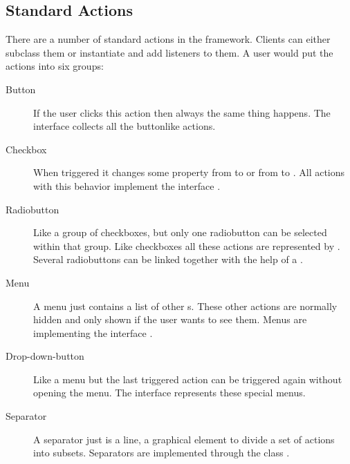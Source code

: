 

\subsection{Standard Actions}
There are a number of standard actions in the framework. Clients can either subclass them or instantiate and add listeners to them. A user would put the actions into six groups:
\begin{description}
 \item[Button] If the user clicks this action then always the same thing happens. The interface  collects all the buttonlike actions.
 \item[Checkbox] When triggered it changes some property from  to  or from  to . All actions with this behavior implement the interface .
 \item[Radiobutton] Like a group of checkboxes, but only one radiobutton can be selected within that group. Like checkboxes all these actions are represented by . Several radiobuttons can be linked together with the help of a .
 \item[Menu] A menu just contains a list of other s. These other actions are normally hidden and only shown if the user wants to see them. Menus are implementing the interface .
 \item[Drop-down-button] Like a menu but the last triggered action can be triggered again without opening the menu. The interface  represents these special menus.
 \item[Separator] A separator just is a line, a graphical element to divide a set of actions into subsets. Separators are implemented through the class .
\end{description}

